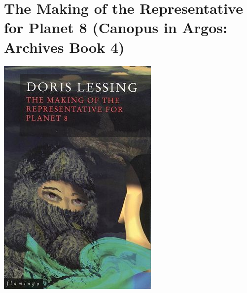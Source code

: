 \documentclass{tufte-handout}
\makeatletter
\newcommand{\varcaption}[2][0pt]{%
  \gsetlength{\@tufte@caption@vertical@offset}{-#1}%
  \gdef\@tufte@stored@varcaption{#2}%
}
\gdef\@tufte@stored@varcaption{} %
\makeatother
\begin{document}
\section*{The Making of the Representative for Planet 8 (Canopus in Argos: Archives Book 4)}
\begin{marginfigure}[\baselineskip]
   \includegraphics[width=\linewidth]{images/making_of_the_representative_for_planet_8.jpg}
   \varcaption{\href{https://www.harpercollins.co.uk/9780006547181/the-making-of-the-representative-for-planet-8/}{Publisher Link}, \href{https://www.amazon.com/Making-Representative-Planet-8/dp/0006547184/}{Amazon Link}}
\end{marginfigure}
\end{document}
